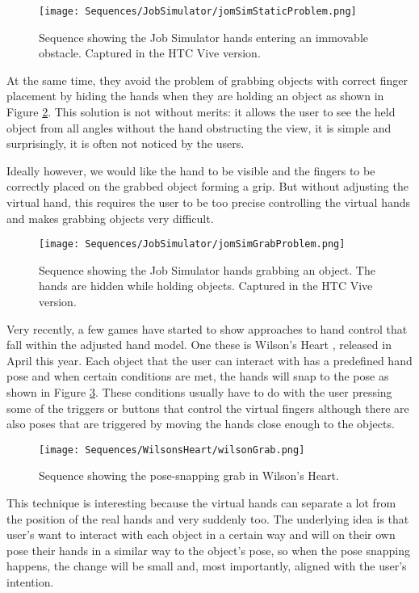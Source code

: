 \begin{figure}[H]
\centering
\texttt{[image: Sequences/JobSimulator/jomSimStaticProblem.png]}
\caption{Sequence showing the Job Simulator hands entering an immovable obstacle. Captured in the HTC Vive version.}
\label{fig:jobSimStaticProblem}
\end{figure}

At the same time, they avoid the problem of grabbing objects with correct finger placement by hiding the hands when they are holding an object as shown in Figure \ref{fig:jobSimGrabProblem}. This solution is not without merits: it allows the user to see the held object from all angles without the hand obstructing the view, it is simple and surprisingly, it is often not noticed by the users.

Ideally however, we would like the hand to be visible and the fingers to be correctly placed on the grabbed object forming a grip. But without adjusting the virtual hand, this requires the user to be too precise controlling the virtual hands and makes grabbing objects very difficult.

\begin{figure}[H]
\centering
\texttt{[image: Sequences/JobSimulator/jomSimGrabProblem.png]}
\caption{Sequence showing the Job Simulator hands grabbing an object. The hands are hidden while holding objects. Captured in the HTC Vive version.}
\label{fig:jobSimGrabProblem}
\end{figure}

Very recently, a few games have started to show approaches to hand control that fall within the adjusted hand model. One these is Wilson's Heart \parencite{TwistedPixelGames2017}, released in April this year. Each object that the user can interact with has a predefined hand pose and when certain conditions are met, the hands will snap to the pose as shown in Figure \ref{fig:wilsonGrab}. These conditions usually have to do with the user pressing some of the triggers or buttons that control the virtual fingers although there are also poses that are triggered by moving the hands close enough to the objects.

\begin{figure}[H]
\centering
\texttt{[image: Sequences/WilsonsHeart/wilsonGrab.png]}
\caption{Sequence showing the pose-snapping grab in Wilson's Heart.}
\label{fig:wilsonGrab}
\end{figure}

This technique is interesting because the virtual hands can separate a lot from the position of the real hands and very suddenly too. The underlying idea is that user's want to interact with each object in a certain way and will on their own pose their hands in a similar way to the object's pose, so when the pose snapping happens, the change will be small and, most importantly, aligned with the user's intention. 


